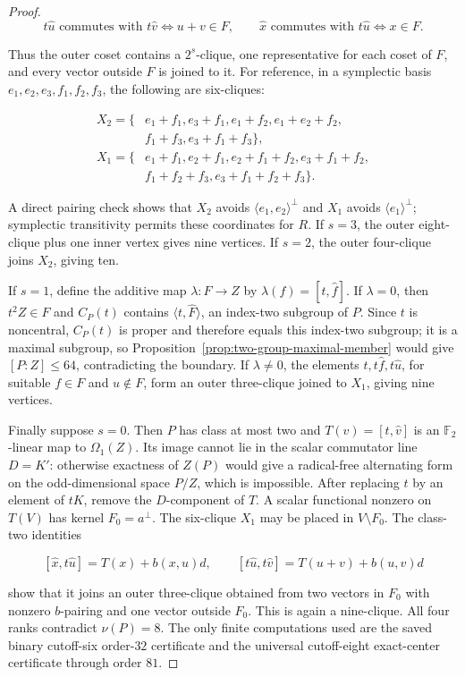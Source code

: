 \documentclass[11pt]{article}
\theoremstyle{remark}
\newcommand{\nuG}{\nu}
\newcommand{\F}{\mathbb F}
\begin{document}
\begin{proof}
\begin{equation}
 t\widehat u\text{ commutes with }t\widehat v
   \Longleftrightarrow u+v\in F,
 \qquad
 \widehat x\text{ commutes with }t\widehat u
   \Longleftrightarrow x\in F.
\label{eq:binary-boundary-joins}
\end{equation}

Thus the outer coset contains a $2^s$-clique, one representative for each
coset of $F$, and every vector outside $F$ is joined to it.  For reference,
in a symplectic basis $e_1,e_2,e_3,f_1,f_2,f_3$, the following are
six-cliques:

\[
\begin{split}
X_2=\{&e_1+f_1,e_3+f_1,e_1+f_2,e_1+e_2+f_2,\\
      &f_1+f_3,e_3+f_1+f_3\},\\
X_1=\{&e_1+f_1,e_2+f_1,e_2+f_1+f_2,e_3+f_1+f_2,\\
      &f_1+f_2+f_3,e_3+f_1+f_2+f_3\}.
\end{split}
\]

A direct pairing check shows that $X_2$ avoids
$\langle e_1,e_2\rangle^\perp$ and $X_1$ avoids
$\langle e_1\rangle^\perp$; symplectic transitivity permits these
coordinates for $R$.  If $s=3$, the outer eight-clique plus one inner
vertex gives nine vertices.  If $s=2$, the outer four-clique joins $X_2$,
giving ten.

If $s=1$, define the additive map
$\lambda:F\to Z$ by $\lambda(f)=[t,\widehat f]$.  If $\lambda=0$, then
$t^2Z\in F$ and $C_P(t)$ contains
$\langle t,\widehat F\rangle$, an index-two subgroup of $P$.  Since $t$ is
noncentral, $C_P(t)$ is proper and therefore equals this index-two subgroup;
it is a maximal subgroup, so Proposition~\ref{prop:two-group-maximal-member}
would give $[P:Z]\le64$, contradicting the boundary.  If
$\lambda\ne0$, the elements
$t,t\widehat f,t\widehat u$, for suitable $f\in F$ and $u\notin F$, form
an outer three-clique joined to $X_1$, giving nine vertices.

Finally suppose $s=0$.  Then $P$ has class at most two and
$T(v)=[t,\widehat v]$ is an $\F_2$-linear map to $\Omega_1(Z)$.  Its image
cannot lie in the scalar commutator line $D=K'$: otherwise exactness of
$Z(P)$ would give a radical-free alternating form on the odd-dimensional
space $P/Z$, which is impossible.  After replacing $t$ by an element of
$tK$, remove the $D$-component of $T$.  A scalar functional nonzero on
$T(V)$ has kernel $F_0=a^\perp$.  The six-clique $X_1$ may be placed in
$V\setminus F_0$.  The class-two identities

\[
 [\widehat x,t\widehat u]=T(x)+b(x,u)d,\qquad
 [t\widehat u,t\widehat v]=T(u+v)+b(u,v)d
\]

show that it joins an outer three-clique obtained from two vectors in
$F_0$ with nonzero $b$-pairing and one vector outside $F_0$.  This is again
a nine-clique.  All four ranks contradict $\nuG(P)=8$.
The only finite computations used are the saved binary cutoff-six
order-$32$ certificate and the universal cutoff-eight exact-center
certificate through order $81$.
\end{proof}
\end{document}
